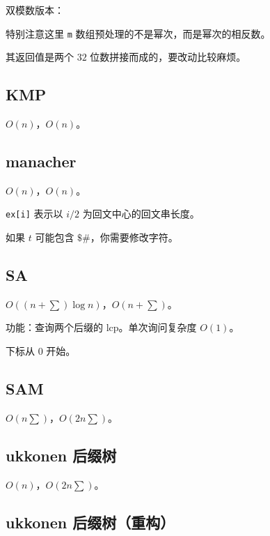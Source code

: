 \documentclass[12pt]{ctexart}
\begin{document}
双模数版本：

特别注意这里 \verb|m| 数组预处理的不是幂次，而是幂次的相反数。

其返回值是两个 $32$ 位数拼接而成的，要改动比较麻烦。




\subsection{KMP}

$O(n)$，$O(n)$。



\subsection{manacher}

$O(n)$，$O(n)$。

\verb|ex[i]| 表示以 $i/2$ 为回文中心的回文串长度。

如果 $t$ 可能包含 $\texttt{\$\#}$，你需要修改字符。



\subsection{SA}

$O((n+\sum)\log n)$，$O(n+\sum)$。

功能：查询两个后缀的 lcp。单次询问复杂度 $O(1)$。

下标从 $0$ 开始。



\subsection{SAM}

$O(n\sum)$，$O(2n\sum )$。



\subsection{ukkonen 后缀树}

$O(n)$，$O(2n\sum )$。



\subsection{ukkonen 后缀树（重构）}
\end{document}

